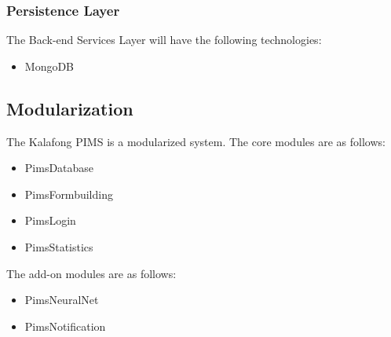 \documentclass[a4paper,12pt,titlepage]{article}
\begin{document}
\subsubsection{Persistence Layer}
The Back-end Services Layer will have the following technologies:
\begin{itemize}
	\item MongoDB
\end{itemize}


\subsection{Modularization}
The Kalafong PIMS is a modularized system.
The core modules are as follows:
\begin{itemize}
	\item PimsDatabase
	\item PimsFormbuilding
	\item PimsLogin	
	\item PimsStatistics	
\end{itemize}
The add-on modules are as follows:
\begin{itemize}
	\item PimsNeuralNet
	\item PimsNotification	
\end{itemize}
\end{document}
